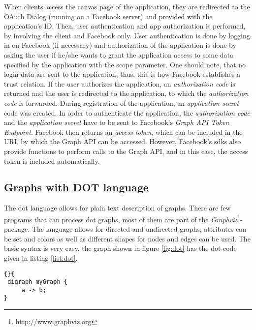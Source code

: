 \documentclass[preprint,12pt]{elsarticle}
\begin{document}
When clients access the canvas page of the application, they are
redirected to the OAuth Dialog (running on a Facebook server) and
provided with the application's ID. Then, user authentication and
app authorization is performed, by involving the client and Facebook
only. User authentication is done by logging in on Facebook (if necessary) and
authorization of the application is done by asking the user if he/she
wants to grant the application access to some data specified by the
application with the scope parameter. One should note, that  no
login data are sent to the application, thus,  this is how Facebook
establishes a trust relation. 
If the user authorizes the application, an \textit{authorization code} is returned and
the user is redirected to the application, to which the
\textit{authorization code} is forwarded. During registration of the
application, an \textit{application secret} code was
created. In order to authenticate the application, the
\textit{authorization code} and the \textit{application secret} have
to be sent to Facebook's \textit{Graph API Token Endpoint}. Facebook
then returns an \textit{access token}, which can be included in the
URL by which the Graph API can be accessed. However, Facebook's
\ac{sdks} also provide functions to perform calls to the Graph API,
and in this case, the access token is included automatically.


\subsection{Graphs with DOT language}
\label{sec:graph-repr-with}
The \ac{dot} language allows for plain text description of
graphs. There are few programs that can process \ac{dot} graphs, most 
of them are part of the
\textit{Graphviz}\footnote{http://www.graphviz.org}-package. 
The language allows for directed and undirected graphs, attributes can
be set and colors as well as different shapes for nodes and edges can
be used. The basic syntax is very easy, the graph shown in figure
\ref{fig:dot} has the \ac{dot}-code given in listing \ref{list:dot}.

\begin{lstlisting}[caption=A very simple DOT-Graph,
  label=list:dot]{}{
 digraph myGraph {
     a -> b;
}
\end{lstlisting}
\end{document}
